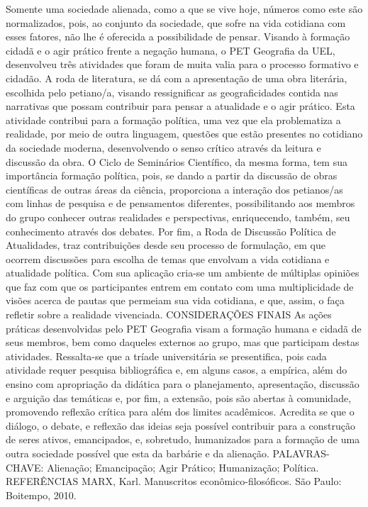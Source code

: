 Somente uma sociedade alienada, como a que se vive hoje, números como este são 
normalizados, pois, ao conjunto da sociedade, que sofre na vida cotidiana com esses fatores, não 
lhe é oferecida a possibilidade de pensar. Visando à formação cidadã e o agir prático frente a 
negação humana, o PET Geografia da UEL, desenvolveu três atividades que foram de muita valia 
para o processo formativo e cidadão. 
A roda de literatura, se dá com a apresentação de uma obra literária, escolhida pelo 
petiano/a, visando ressignificar as geograficidades contida nas narrativas que possam contribuir 
para pensar a atualidade e o agir prático. Esta atividade contribui para a formação política, uma 
vez que ela problematiza a realidade, por meio de outra linguagem, questões que estão presentes 
no cotidiano da sociedade moderna, desenvolvendo o senso crítico através da leitura e discussão
da obra.
O Ciclo de Seminários Científico, da mesma forma, tem sua importância formação política, 
pois, se dando a partir da discussão de obras científicas de outras áreas da ciência, proporciona a
interação dos petianos/as com linhas de pesquisa e de pensamentos diferentes, possibilitando aos 
membros do grupo conhecer outras realidades e perspectivas, enriquecendo, também, seu
conhecimento através dos debates.
Por fim, a Roda de Discussão Política de Atualidades, traz contribuições desde seu 
processo de formulação, em que ocorrem discussões para escolha de temas que envolvam a vida 
cotidiana e atualidade política. Com sua aplicação cria-se um ambiente de múltiplas opiniões que
faz com que os participantes entrem em contato com uma multiplicidade de visões acerca de pautas
que permeiam sua vida cotidiana, e que, assim, o faça refletir sobre a realidade vivenciada.
CONSIDERAÇÕES FINAIS
As ações práticas desenvolvidas pelo PET Geografia visam a formação humana e cidadã 
de seus membros, bem como daqueles externos ao grupo, mas que participam destas atividades. 
Ressalta-se que a tríade universitária se presentifica, pois cada atividade requer pesquisa 
bibliográfica e, em alguns casos, a empírica, além do ensino com apropriação da didática para o 
planejamento, apresentação, discussão e arguição das temáticas e, por fim, a extensão, pois são 
abertas à comunidade, promovendo reflexão crítica para além dos limites acadêmicos. Acreditase que o diálogo, o debate, e reflexão das ideias seja possível contribuir para a construção de seres 
ativos, emancipados, e, sobretudo, humanizados para a formação de uma outra sociedade possível
que esta da barbárie e da alienação.
PALAVRAS-CHAVE: Alienação; Emancipação; Agir Prático; Humanização; Política.
REFERÊNCIAS
MARX, Karl. Manuscritos econômico-filosóficos. São Paulo: Boitempo, 2010.

